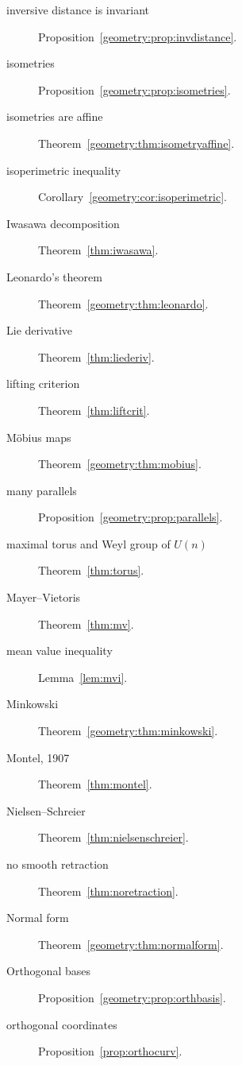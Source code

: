 \begin{description}
\item[inversive distance is invariant] Proposition~\ref{geometry:prop:invdistance}.
\item[isometries] Proposition~\ref{geometry:prop:isometries}.
\item[isometries are affine] Theorem~\ref{geometry:thm:isometryaffine}.
\item[isoperimetric inequality] Corollary~\ref{geometry:cor:isoperimetric}.
\item[Iwasawa decomposition] Theorem~\ref{thm:iwasawa}.
\item[Leonardo's theorem] Theorem~\ref{geometry:thm:leonardo}.
\item[Lie derivative] Theorem~\ref{thm:liederiv}.
\item[lifting criterion] Theorem~\ref{thm:liftcrit}.
\item[M\"obius maps] Theorem~\ref{geometry:thm:mobius}.
\item[many parallels] Proposition~\ref{geometry:prop:parallels}.
\item[maximal torus and Weyl group of $U(n)$] Theorem~\ref{thm:torus}.
\item[Mayer--Vietoris] Theorem~\ref{thm:mv}.
\item[mean value inequality] Lemma~\ref{lem:mvi}.
\item[Minkowski] Theorem~\ref{geometry:thm:minkowski}.
\item[Montel, 1907] Theorem~\ref{thm:montel}.
\item[Nielsen--Schreier] Theorem~\ref{thm:nielsenschreier}.
\item[no smooth retraction] Theorem~\ref{thm:noretraction}.
\item[Normal form] Theorem~\ref{geometry:thm:normalform}.
\item[Orthogonal bases] Proposition~\ref{geometry:prop:orthbasis}.
\item[orthogonal coordinates] Proposition~\ref{prop:orthocurv}.

\end{description}
